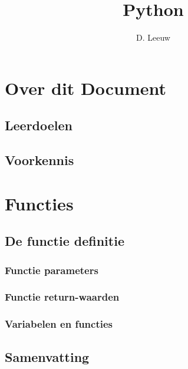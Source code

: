 \documentclass[a4paper,12pt,twoside,openright,titlepage]{article}
\author{D. Leeuw}
\title{Python}
\date{\today\\
1.1.0\\
\vfill
\raggedright
\copyright\ 2020-2025 Dennis Leeuw\\
}
\begin{document}

\maketitle


\section{Over dit Document}
\subsection{Leerdoelen}

\subsection{Voorkennis}



\section{Functies}

\subsection{De functie definitie}

\subsubsection{Functie parameters}

\subsubsection{Functie return-waarden}

\subsubsection{Variabelen en functies}

\subsection{Samenvatting}

%
%

\printindex
\end{document}
